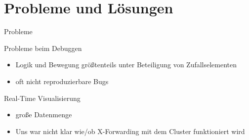 \section{Probleme und Lösungen}

\begin{frame}{Probleme}
	\begin{block}{Probleme beim Debuggen}
		\begin{itemize}
			\item Logik und Bewegung größtenteils unter Beteiligung von Zufallselementen
			\item oft nicht reproduzierbare Bugs 
		\end{itemize}
	\end{block}
	
	\begin{block} {Real-Time Visualisierung}
		\begin{itemize}
			\item große Datenmenge
			\item Uns war nicht klar wie/ob X-Forwarding mit dem Cluster funktioniert wird
		\end{itemize}
	\end{block}
\end{frame}


	
